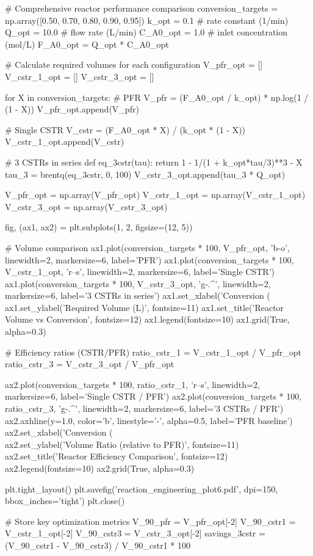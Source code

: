 \documentclass[11pt,a4paper]{article}
\begin{document}
\begin{pycode}
# Comprehensive reactor performance comparison
conversion_targets = np.array([0.50, 0.70, 0.80, 0.90, 0.95])
k_opt = 0.1  # rate constant (1/min)
Q_opt = 10.0  # flow rate (L/min)
C_A0_opt = 1.0  # inlet concentration (mol/L)
F_A0_opt = Q_opt * C_A0_opt

# Calculate required volumes for each configuration
V_pfr_opt = []
V_cstr_1_opt = []
V_cstr_3_opt = []

for X in conversion_targets:
    # PFR
    V_pfr = (F_A0_opt / k_opt) * np.log(1 / (1 - X))
    V_pfr_opt.append(V_pfr)

    # Single CSTR
    V_cstr = (F_A0_opt * X) / (k_opt * (1 - X))
    V_cstr_1_opt.append(V_cstr)

    # 3 CSTRs in series
    def eq_3cstr(tau):
        return 1 - 1/(1 + k_opt*tau/3)**3 - X
    tau_3 = brentq(eq_3cstr, 0, 100)
    V_cstr_3_opt.append(tau_3 * Q_opt)

V_pfr_opt = np.array(V_pfr_opt)
V_cstr_1_opt = np.array(V_cstr_1_opt)
V_cstr_3_opt = np.array(V_cstr_3_opt)

fig, (ax1, ax2) = plt.subplots(1, 2, figsize=(12, 5))

# Volume comparison
ax1.plot(conversion_targets * 100, V_pfr_opt, 'b-o', linewidth=2, markersize=6, label='PFR')
ax1.plot(conversion_targets * 100, V_cstr_1_opt, 'r--s', linewidth=2, markersize=6, label='Single CSTR')
ax1.plot(conversion_targets * 100, V_cstr_3_opt, 'g-.^', linewidth=2, markersize=6, label='3 CSTRs in series')
ax1.set_xlabel('Conversion (\\%
ax1.set_ylabel('Required Volume (L)', fontsize=11)
ax1.set_title('Reactor Volume vs Conversion', fontsize=12)
ax1.legend(fontsize=10)
ax1.grid(True, alpha=0.3)

# Efficiency ratios (CSTR/PFR)
ratio_cstr_1 = V_cstr_1_opt / V_pfr_opt
ratio_cstr_3 = V_cstr_3_opt / V_pfr_opt

ax2.plot(conversion_targets * 100, ratio_cstr_1, 'r--s', linewidth=2, markersize=6, label='Single CSTR / PFR')
ax2.plot(conversion_targets * 100, ratio_cstr_3, 'g-.^', linewidth=2, markersize=6, label='3 CSTRs / PFR')
ax2.axhline(y=1.0, color='b', linestyle='-', alpha=0.5, label='PFR baseline')
ax2.set_xlabel('Conversion (\\%
ax2.set_ylabel('Volume Ratio (relative to PFR)', fontsize=11)
ax2.set_title('Reactor Efficiency Comparison', fontsize=12)
ax2.legend(fontsize=10)
ax2.grid(True, alpha=0.3)

plt.tight_layout()
plt.savefig('reaction_engineering_plot6.pdf', dpi=150, bbox_inches='tight')
plt.close()

# Store key optimization metrics
V_90_pfr = V_pfr_opt[-2]
V_90_cstr1 = V_cstr_1_opt[-2]
V_90_cstr3 = V_cstr_3_opt[-2]
savings_3cstr = (V_90_cstr1 - V_90_cstr3) / V_90_cstr1 * 100
\end{pycode}
\end{document}
